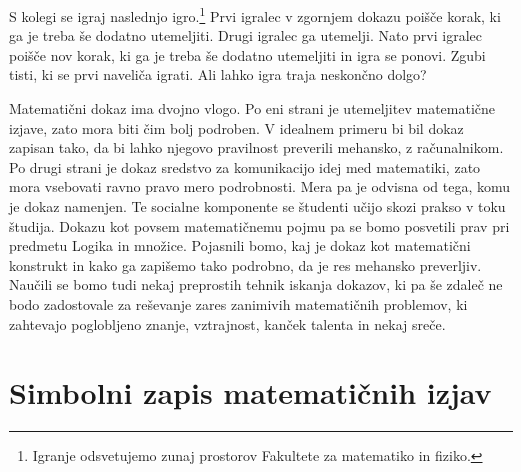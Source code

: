 \begin{naloga}
  S kolegi se igraj naslednjo igro.\footnote{%
    Igranje odsvetujemo zunaj prostorov Fakultete za matematiko in fiziko.}
  Prvi igralec v zgornjem dokazu poišče korak, ki ga je treba še dodatno
  utemeljiti. Drugi igralec ga utemelji. Nato prvi igralec poišče nov korak,
  ki ga je treba še dodatno utemeljiti in igra se ponovi. Zgubi tisti, ki se prvi naveliča igrati. Ali lahko igra traja neskončno dolgo?
\end{naloga}

Matematični dokaz ima dvojno vlogo. Po eni strani je utemeljitev matematične
izjave, zato mora biti čim bolj podroben. V idealnem primeru bi bil dokaz
zapisan tako, da bi lahko njegovo pravilnost preverili mehansko, z
računalnikom. Po drugi strani je dokaz sredstvo za komunikacijo idej med
matematiki, zato mora vsebovati ravno pravo mero podrobnosti. Mera pa je
odvisna od tega, komu je dokaz namenjen. Te socialne komponente se študenti
učijo skozi prakso v toku študija. Dokazu kot povsem matematičnemu pojmu pa se
bomo posvetili prav pri predmetu Logika in množice. Pojasnili bomo, kaj je
dokaz kot matematični konstrukt in kako ga zapišemo tako podrobno, da je res
mehansko preverljiv. Naučili se bomo tudi nekaj preprostih tehnik iskanja
dokazov, ki pa še zdaleč ne bodo zadostovale za reševanje zares zanimivih
matematičnih problemov, ki zahtevajo poglobljeno znanje, vztrajnost, kanček
talenta in nekaj sreče.



\section{Simbolni zapis matematičnih izjav}
\label{sec:simbolni-zapis-izjav}

